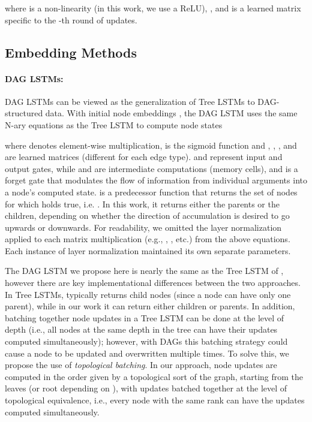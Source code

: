 \documentclass{article}
\begin{document}
where  is a non-linearity (in this work, we use a ReLU), , and  is a learned matrix specific to the -th round of updates.

\subsection{ Embedding Methods}
\label{sec:global_embedders}
\paragraph{DAG LSTMs:} DAG LSTMs can be viewed as the generalization of Tree LSTMs \cite{tai2015improved} to DAG-structured data. With initial node embeddings , the DAG LSTM uses the same N-ary equations as the Tree LSTM to compute node states 

where  denotes element-wise multiplication,  is the sigmoid function and , , , and  are learned matrices (different for each edge type).  and  represent input and output gates, while  and  are intermediate computations (memory cells), and  is a forget gate that modulates the flow of information from individual arguments into a node's computed state.  is a predecessor function that returns the set of nodes for which  holds true, i.e. . In this work, it returns either the parents or the children, depending on whether the direction of accumulation is desired to go upwards or downwards. For readability, we omitted the layer normalization \cite{ba2016layer} applied to each matrix multiplication (e.g., , , etc.) from the above equations. Each instance of layer normalization maintained its own separate parameters.


The DAG LSTM we propose here is nearly the same as the Tree LSTM of \cite{tai2015improved}, however there are key implementational differences between the two approaches. In Tree LSTMs,  typically returns child nodes (since a node can have only one parent), while in our work it can return either children or parents. In addition, batching together node updates in a Tree LSTM can be done at the level of depth (i.e., all nodes at the same depth in the tree can have their updates computed simultaneously); however, with DAGs this batching strategy could cause a node to be updated and overwritten multiple times. To solve this, we propose the use of \emph{topological batching}. In our approach, node updates are computed in the order given by a topological sort of the graph, starting from the leaves (or root depending on ), with updates batched together at the level of topological equivalence, i.e., every node with the same rank can have the updates computed simultaneously.
\end{document}
